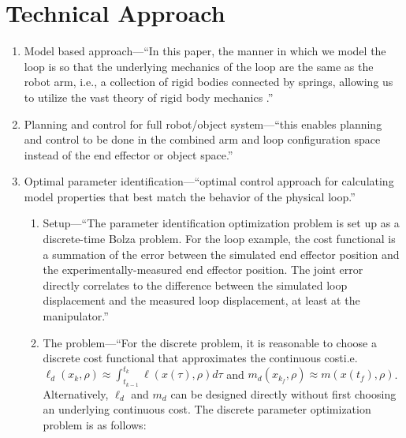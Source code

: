 \documentclass[runningheads,a4paper]{llncs}
\begin{document}
\section{Technical Approach}
\begin{enumerate}
\item Model based approach---``In this paper, the manner in which we model the loop is so that the underlying mechanics of the loop are the same as the robot arm, i.e., a collection of rigid bodies connected by springs, allowing us to utilize the vast theory of rigid body mechanics \cite{murray_li_sastry}.''
\item Planning and control for full robot/object system---``this enables planning and control to be done in the combined arm and loop configuration space instead of the end effector or object space.''
\item Optimal parameter identification---``optimal control approach for calculating model properties that best match the behavior of the physical loop.''
\begin{enumerate}
\item Setup---``The parameter identification optimization problem is set up as a discrete-time Bolza problem.  For the loop example, the cost functional is a summation of the error between the simulated end effector position and the experimentally-measured end effector position.  The joint error directly correlates to the difference between the simulated loop displacement and the measured loop displacement, at least at the manipulator.''
\item The problem---``For the discrete problem, it is reasonable to choose a discrete cost functional that approximates the continuous cost\textemdash i.e. $\ell_d(x_{k},\rho)\approx\int_{t_{k-1}}^{t_{k}}\ell(x(\tau),\rho)d\tau$ and $m_d(x_{k_f},\rho)\approx m(x(t_f),\rho)$.  Alternatively, $\ell_d$ and $m_d$ can be designed directly without first choosing an underlying continuous cost.  The discrete parameter optimization problem is as follows:

\end{enumerate}
\end{enumerate}
\end{document}
